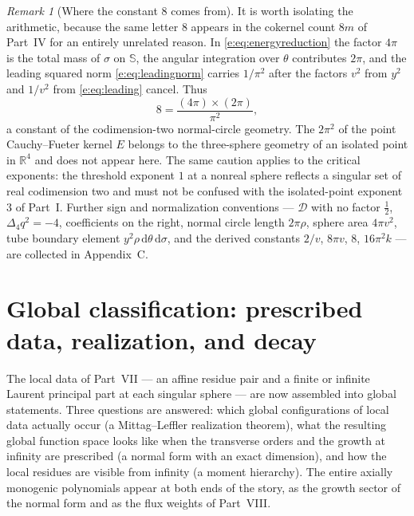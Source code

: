 \documentclass[11pt,a4paper]{article}
\numberwithin{equation}{section}
\theoremstyle{definition}
\theoremstyle{remark}
\newtheorem{remark}[theorem]{Remark}
\theoremstyle{plain}
\newcommand{\RR}{\mathbb R}
\newcommand{\SSS}{\mathbb S}
\newcommand{\Dop}{\mathcal D}
\newcommand{\lap}{\Delta_4}
\newcommand{\dd}{\mathrm d}
\begin{document}
\begin{remark}[Where the constant $8$ comes from]
\label{e:rem:audit8}
It is worth isolating the arithmetic, because the same letter $8$ appears
in the cokernel count $8m$ of Part~IV for an entirely unrelated reason.
In \eqref{e:eq:energyreduction} the factor $4\pi$ is the total mass of
$\sigma$ on $\SSS$, the angular integration over $\theta$ contributes
$2\pi$, and the leading squared norm \eqref{e:eq:leadingnorm} carries
$1/\pi^2$ after the factors $v^2$ from $y^2$ and $1/v^2$ from
\eqref{e:eq:leading} cancel. Thus
\[
 8=\frac{(4\pi)\times(2\pi)}{\pi^2},
\]
a constant of the codimension-two normal-circle geometry. The $2\pi^2$
of the point Cauchy--Fueter kernel $E$ belongs to the three-sphere
geometry of an isolated point in $\RR^4$ and does not appear here. The
same caution applies to the critical exponents: the threshold exponent
$1$ at a nonreal sphere reflects a singular set of real codimension two
and must not be confused with the isolated-point exponent $3$ of Part~I.
Further sign and normalization conventions --- $\Dop$ with no factor
$\tfrac12$, $\lap q^2=-4$, coefficients on the right, normal circle
length $2\pi\rho$, sphere area $4\pi v^2$, tube boundary element
$y^2\rho\,\dd\theta\,\dd\sigma$, and the derived constants $2/v$,
$8\pi v$, $8$, $16\pi^2k$ --- are collected in Appendix~C.
\end{remark}



\section{Global classification: prescribed data, realization, and decay}
\label{e:sec:global}

The local data of Part~VII --- an affine residue pair and a finite or
infinite Laurent principal part at each singular sphere --- are now
assembled into global statements. Three questions are answered: which
global configurations of local data actually occur (a Mittag--Leffler
realization theorem), what the resulting global function space looks like
when the transverse orders and the growth at infinity are prescribed (a
normal form with an exact dimension), and how the local residues are
visible from infinity (a moment hierarchy). The entire axially monogenic
polynomials appear at both ends of the story, as the growth sector of the
normal form and as the flux weights of Part~VIII.
\end{document}
